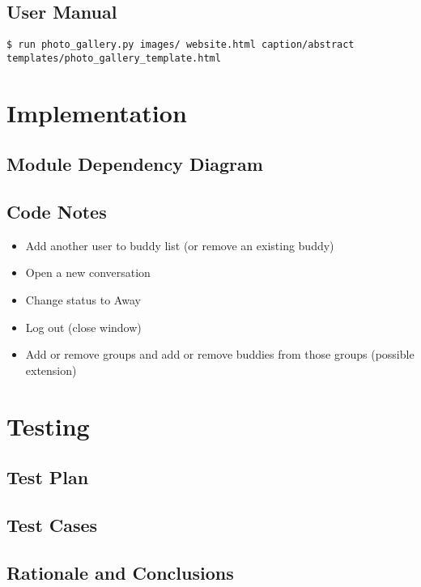 \documentclass[11pt,letterpaper]{article}
\begin{document}
\subsection{User Manual}
\begin{verbatim}
$ run photo_gallery.py images/ website.html caption/abstract templates/photo_gallery_template.html
\end{verbatim}

\section{Implementation}

\subsection{Module Dependency Diagram}
\subsection{Code Notes}


\begin{itemize}
\item Add another user to buddy list (or remove an existing buddy) 
\item Open a new conversation
\item Change status to Away
\item Log out (close window)
\item Add or remove groups and add or remove buddies from those groups (possible extension)
\end{itemize}



\section{Testing}

\subsection{Test Plan}
\subsection{Test Cases}
\subsection{Rationale and Conclusions}
\end{document}
